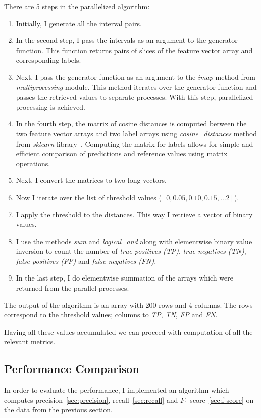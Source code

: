There are 5 steps in the parallelized algorithm:
\begin{enumerate}
    \item Initially, I generate all the interval pairs.
    \item In the second step, I pass the intervals as an argument to the generator function.
    This function returns pairs of slices of the feature vector array and corresponding labels.
    \item Next, I pass the generator function as an argument to the \textit{imap} method from \textit{multiprocessing}
    module.
    This method iterates over the generator function and passes the retrieved values to separate processes.
    With this step, parallelized processing is achieved.
    \item In the fourth step, the matrix of cosine distances is computed between the two feature vector arrays
    and two label arrays using \textit{cosine\_distances} method from \textit{sklearn} library~\cite{scikit-learn}.
    Computing the matrix for labels allows for simple and efficient comparison of predictions and reference
    values using matrix operations.
    \item Next, I convert the matrices to two long vectors.
    \item Now I iterate over the list of threshold values ($\left[ 0, 0.05, 0.10, 0.15, \ldots 2 \right]$).
    \item I apply the threshold to the distances.
    This way I retrieve a vector of binary values.
    \item I use the methods \textit{sum} and \textit{logical\_and} along with elementwise binary value inversion to
    count the number of \textit{true positives (TP)}, \textit{true negatives (TN)}, \textit{false positives (FP)} and
    \textit{false negatives (FN)}.
    \item In the last step, I do elementwise summation of the arrays which were returned from the parallel processes.
\end{enumerate}

The output of the algorithm is an array with 200 rows and 4 columns.
The rows correspond to the threshold values; columns to \textit{TP}, \textit{TN}, \textit{FP} and \textit{FN}.

Having all these values accumulated we can proceed with computation of all the relevant metrics.

\subsection{Performance Comparison}\label{subsec:performance-comparison}
In order to evaluate the performance, I implemented an algorithm which computes precision~\ref{sec:precision},
recall~\ref{sec:recall} and $F_1$ score~\ref{sec:f-score} on the data from the previous section.

